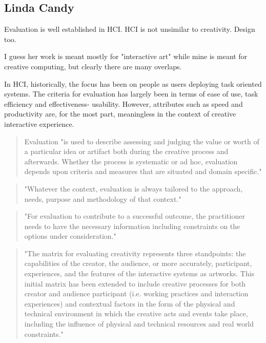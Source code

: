 \subsection{Linda Candy}

Evaluation is well established in HCI. HCI is not unsimilar to creativity. Design too.

I guess her work is meant mostly for "interactive art" while mine is meant for creative computing, but clearly there are many overlaps.

In HCI, historically, the focus has been on people as users deploying task oriented systems. The criteria for evaluation has largely been in terms of ease of use, task efficiency and effectiveness- usability. However, attributes such as speed and productivity are, for the most part, meaningless in the context of creative interactive experience. \citep[p.23]{Candy2012}

\begin{quote}
Evaluation "is used to describe assessing and judging the value or worth of a particular idea or artifact both during the creative process and afterwards. Whether the process is systematic or ad hoc, evaluation depends upon criteria and measures that are situated and domain specific." \citep[p.7]{Candy2012}
\end{quote}

\begin{quote}
"Whatever the context, evaluation is always tailored to the approach, needs, purpose and methodology of that context." \citep[p.7]{Candy2012}
\end{quote}

\begin{quote}
"For evaluation to contribute to a successful outcome, the practitioner needs to have the necessary information including constraints on the options under consideration." \citep[p.7]{Candy2012}
\end{quote}

\begin{quote}
"The matrix for evaluating creativity represents three standpoints: the capabilities of the creator, the audience, or more accurately, participant, experiences, and the features of the interactive systems as artworks. This initial matrix has been extended to include creative processes for both creator and audience participant (i.e. working practices and interaction experiences) and contextual factors in the form of the physical and technical environment in which the creative acts and events take place, including the influence of physical and technical resources and real world constraints." \citep[p.7-8]{Candy2012}
\end{quote}

